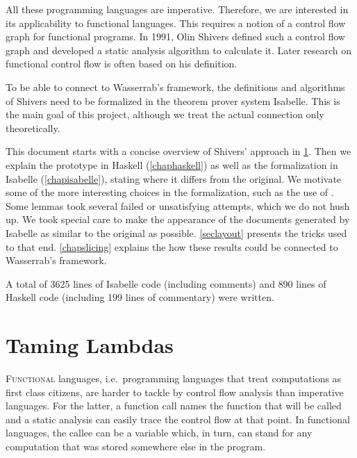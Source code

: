 \documentclass[a4paper,parskip=half,BCOR=8mm,DIV=calc,12pt]{scrbook}
\begin{document}
All these programming languages are imperative. Therefore, we are interested in its applicability to functional languages. This requires a notion of a control flow graph for functional programs. In 1991, Olin Shivers defined such a control flow graph and developed a static analysis algorithm to calculate it. Later research on functional control flow is often based on his definition.

To be able to connect to Wasserrab’s framework, the definitions and algorithms of Shivers need to be formalized in the theorem prover system Isabelle. This is the main goal of this project, although we treat the actual connection only theoretically.

This document starts with a concise overview of Shivers’ approach in \cref{chapshivers}. Then we explain the prototype in Haskell (\cref{chaphaskell}) as well as the formalization in Isabelle (\cref{chapisabelle}), stating where it differs from the original. We motivate some of the more interesting choices in the formalization, such as the use of . Some lemmas took several failed or unsatisfying attempts, which we do not hush up. We took special care to make the appearance of the documents generated by Isabelle as similar to the original as possible. \cref{seclayout} presents the tricks used to that end. \cref{chapslicing} explains the how these results could be connected to Wasserrab’s framework.

A total of 3625 lines of Isabelle code (including comments) and 890 lines of Haskell code (including 199 lines of commentary) were written.


% 

\chapter{Taming Lambdas}
\label{chapshivers}

\lettrine F{unctional} languages, i.e.\ programming languages that treat computations as first class citizens, are harder to tackle by control flow analysis than imperative languages. For the latter, a function call names the function that will be called and a static analysis can easily trace the control flow at that point. In functional languages, the callee can be a variable which, in turn, can stand for any computation that was stored somewhere else in the program.
\end{document}
